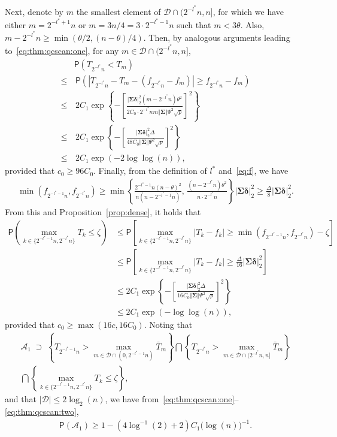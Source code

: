 \documentclass[11pt, a4paper]{article}
\newcommand{\mc}{\mathcal}
\renewcommand{\l}{\left}
\renewcommand{\r}{\right}
\newcommand{\cp}{\theta}
\newcommand{\p}{\mathsf{P}}
\newcommand{\nn}{\nonumber}
\theoremstyle{definition}
\theoremstyle{definition}
\theoremstyle{definition}
\theoremstyle{definition}
\theoremstyle{definition}
\theoremstyle{remark}
\theoremstyle{definition}
\theoremstyle{definition}
\theoremstyle{definition}
\begin{document}
Next, denote by $m$ the smallest element of $\mc D \cap (2^{-l^*}n, n]$, for which we have either $m = 2^{-l^* + 1}n$ or $m = 3n/4 = 3 \cdot 2^{-l^* - 1}n$ such that $m < 3 \cp$.
Also, $m - 2^{-l^*}n \ge \min(\cp/2, (n - \cp)/4)$.
Then, by analogous arguments leading to~\eqref{eq:thm:qcscan:one}, for any $m \in \mc D \cap (2^{-l^*}n, n]$,
\begin{align}
& \p\l( T_{2^{-l^*}n} < T_m \r)
\nn \\
\le & \, \p\l( \l\vert T_{2^{-l^*}n} - T_m - (f_{2^{-l^*}n} - f_m) \r\vert \ge f_{2^{-l^*}n} - f_m \r)
\nn \\
\le & \, 2 C_1 \exp\l\{ - \l[ 
\frac{\vert \bm\Sigma \bm\delta \vert_2^2 (m - 2^{-l^*}n) \cp^2}{2 C_0 \cdot 2^{-l^*}n m \Vert \bm\Sigma \Vert \Psi^2 \sqrt{p}}
\r]^2 \r\}
\nn \\
\le & \, 2 C_1 \exp\l\{ - \l[ 
\frac{\vert \bm\Sigma \bm\delta \vert_2^2 \Delta}{48 C_0 \Vert \bm\Sigma \Vert \Psi^2 \sqrt{p}} \r]^2 \r\} 
\nn \\
\le & \, 2 C_1 \exp( - 2 \log\log(n)),
\label{eq:thm:qcscan:two}
\end{align}
provided that $c_0 \ge 96 C_0$.
Finally, from the definition of $l^*$ and~\eqref{eq:f}, we have
\begin{align*}
\min\l( f_{2^{-l^* - 1} n}, f_{2^{-l^*} n} \r) \ge \min\l\{ \frac{2^{-l^* - 1} n (n - \cp)^2}{n (n - 2^{-l^* - 1}n)}, \, \frac{(n - 2^{-l^*} n ) \cp^2}{n \cdot 2^{-l^*}n} \r\} \vert \bm\Sigma \bm\delta \vert_2^2 \ge \frac{\Delta}{8} \vert \bm\Sigma \bm\delta \vert_2^2.
\end{align*}
From this and Proposition~\ref{prop:dense}, it holds that
\begin{align*}
\p\l( \max_{k \in \{2^{-l^* - 1} n, 2^{-l^*} n\}} T_k \le \zeta \r)
&\le \p\l[ \max_{k \in \{2^{-l^* - 1} n, 2^{-l^*} n\}} \vert T_k - f_k \vert \ge \min\l( f_{2^{-l^* - 1} n}, f_{2^{-l^*} n} \r) - \zeta \r]
\\
&\le \p\l[ \max_{k \in \{2^{-l^* - 1} n, 2^{-l^*} n\}} \vert T_k - f_k \vert \ge \frac{\Delta}{16} \vert \bm\Sigma \bm\delta \vert_2^2 \r] 
\\
&\le 2C_1 \exp\l\{ -\l[ \frac{\vert \bm\Sigma \bm\delta \vert_2^2 \Delta}{16 C_0 \Vert \bm\Sigma \Vert \Psi^2 \sqrt{p}} \r]^2 \r\}
\\
&\le 2C_1 \exp( - \log\log(n)),
\end{align*}
provided that $c_0 \ge \max(16 c, 16C_0)$.
Noting that
\begin{align*}
\mc A_1 \;\supset\; \l\{ T_{2^{-l^* - 1}n} > \max_{m \in \mc D \cap (0, 2^{-l^* - 1}n)} \bar{T}_m \r\}
\bigcap \l\{ T_{2^{-l^*}n} > \max_{m \in \mc D \cap (2^{-l^*}n, n]} \bar{T}_m \r\} 
\\
\bigcap \l\{ \max_{k \in \{2^{-l^* - 1} n, 2^{-l^*} n\}} T_k \le \zeta \r\},
\end{align*}
and that $\vert \mc D \vert \le 2 \log_2(n)$, we have from~\eqref{eq:thm:qcscan:one}--\eqref{eq:thm:qcscan:two},
\begin{align*}
\p(\mc A_1) \ge 1 - (4 \log^{-1}(2) + 2) C_1 \bigl(\log(n)\bigr)^{-1}.
\end{align*}
\end{document}
